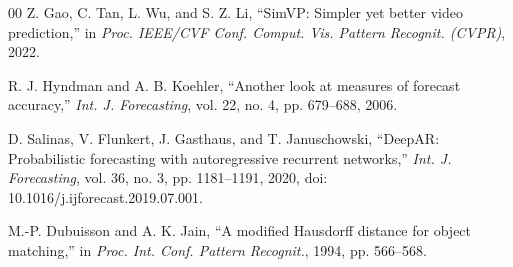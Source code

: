 \documentclass[letterpaper, 10 pt, conference]{ieeeconf}
\begin{document}
\begin{thebibliography}{00}
Z. Gao, C. Tan, L. Wu, and S. Z. Li, ``SimVP: Simpler yet better video prediction,'' in \emph{Proc. IEEE/CVF Conf. Comput. Vis. Pattern Recognit. (CVPR)}, 2022.

R. J. Hyndman and A. B. Koehler, ``Another look at measures of forecast accuracy,'' \emph{Int. J. Forecasting}, vol. 22, no. 4, pp. 679--688, 2006.

D. Salinas, V. Flunkert, J. Gasthaus, and T. Januschowski, ``DeepAR: Probabilistic forecasting with autoregressive recurrent networks,'' \emph{Int. J. Forecasting}, vol. 36, no. 3, pp. 1181--1191, 2020, doi: 10.1016/j.ijforecast.2019.07.001.

M.-P. Dubuisson and A. K. Jain, ``A modified Hausdorff distance for object matching,'' in \emph{Proc. Int. Conf. Pattern Recognit.}, 1994, pp. 566--568.

\end{thebibliography}
\end{document}
